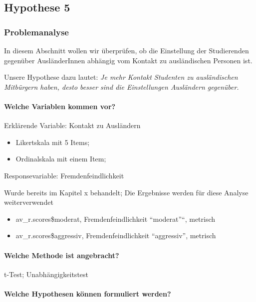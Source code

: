 \documentclass[]{article}
\providecommand{\tightlist}{%
  \setlength{\itemsep}{0pt}\setlength{\parskip}{0pt}}
\let\oldparagraph\paragraph
\renewcommand{\paragraph}[1]{\oldparagraph{#1}\mbox{}}
\begin{document}
\subsection{Hypothese 5}\label{hypothese-5}

\subsubsection{Problemanalyse}\label{problemanalyse-2}

In diesem Abschnitt wollen wir überprüfen, ob die Einstellung der
Studierenden gegenüber AusländerInnen abhängig vom Kontakt zu
ausländischen Personen ist.

Unsere Hypothese dazu lautet: \emph{Je mehr Kontakt Studenten zu
ausländischen Mitbürgern haben, desto besser sind die Einstellungen
Ausländern gegenüber.}

\paragraph{Welche Variablen kommen
vor?}\label{welche-variablen-kommen-vor-2}

Erklärende Variable: Kontakt zu Ausländern

\begin{itemize}
\tightlist
\item
  Likertskala mit 5 Items;
\item
  Ordinalskala mit einem Item;
\end{itemize}

Responsevariable: Fremdenfeindlichkeit

Wurde bereits im Kapitel x behandelt; Die Ergebnisse werden für diese
Analyse weiterverwendet

\begin{itemize}
\item
  av\_r.scores\$moderat, Fremdenfeindlichkeit ``moderat''``, metrisch
\item
  av\_r.scores\$aggressiv, Fremdenfeindlichkeit ``aggressiv'', metrisch
\end{itemize}

\paragraph{Welche Methode ist
angebracht?}\label{welche-methode-ist-angebracht-2}

t-Test; Unabhängigkeitstest

\paragraph{Welche Hypothesen können formuliert
werden?}\label{welche-hypothesen-konnen-formuliert-werden-2}
\end{document}
